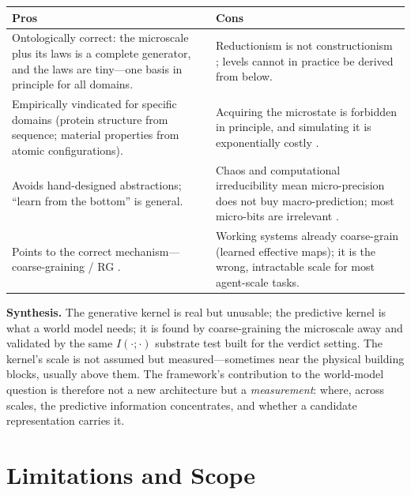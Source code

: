\documentclass[10pt,twocolumn]{article}
\begin{document}
\begin{center}\small
\begin{tabular}{@{}p{}p{}@{}}
\toprule
Pros & Cons\\
\midrule
Ontologically correct: the microscale plus its laws is a complete generator, and
the laws are tiny---one basis in principle for all domains. &
Reductionism is not constructionism \citep{anderson1972more}; levels cannot in
practice be derived from below.\\
Empirically vindicated for specific domains (protein structure from sequence;
material properties from atomic configurations). &
Acquiring the microstate is forbidden in principle, and simulating it is
exponentially costly \citep{feynman1982simulating}.\\
Avoids hand-designed abstractions; ``learn from the bottom'' is general. &
Chaos and computational irreducibility \citep{wolfram2002nks} mean micro-precision
does not buy macro-prediction; most micro-bits are irrelevant
\citep{bialek2001predictability}.\\
Points to the correct mechanism---coarse-graining / RG \citep{mehta2014exact}. &
Working systems already coarse-grain (learned effective maps); it is the wrong,
intractable scale for most agent-scale tasks.\\
\bottomrule
\end{tabular}
\end{center}

\noindent\textbf{Synthesis.} The generative kernel is real but unusable; the
predictive kernel is what a world model needs; it is found by coarse-graining the
microscale away and validated by the same $I(\cdot;\cdot)$ substrate test built for
the verdict setting. The kernel's scale is not assumed but measured---sometimes
near the physical building blocks, usually above them. The framework's contribution
to the world-model question is therefore not a new architecture but a
\emph{measurement}: where, across scales, the predictive information concentrates,
and whether a candidate representation carries it.

\section{Limitations and Scope}
\label{sec:limits}
\end{document}
